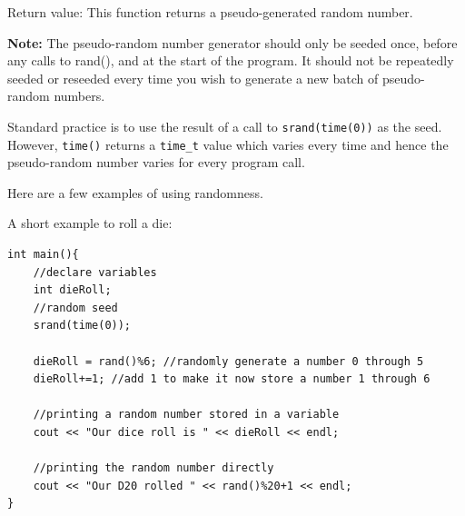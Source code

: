 Return value: This function returns a pseudo-generated random number.

\textbf{Note:} The pseudo-random number generator should only be seeded once, before any calls to rand(), and at the start of the program. It should not be repeatedly seeded or reseeded every time you wish to generate a new batch of pseudo-random numbers. 

Standard practice is to use the result of a call to \texttt{srand(time(0))} as the seed. However, \texttt{time()} returns a \texttt{time_t} value which varies every time and hence the pseudo-random number varies for every program call. 

Here are a few examples of using randomness.

\begin{example}
    A short example to roll a die:

    \begin{verbatim}
int main(){
    //declare variables
    int dieRoll;
    //random seed 
    srand(time(0));

    dieRoll = rand()%6; //randomly generate a number 0 through 5
    dieRoll+=1; //add 1 to make it now store a number 1 through 6

    //printing a random number stored in a variable
    cout << "Our dice roll is " << dieRoll << endl; 

    //printing the random number directly
    cout << "Our D20 rolled " << rand()%20+1 << endl; 
}
    \end{verbatim}
\end{example}

